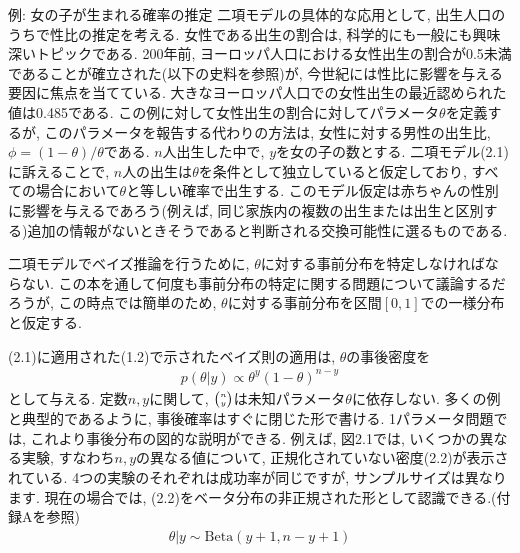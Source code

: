 \documentclass[10pt,dvipdfmx,a4]{beamer}
\newcommand{\eq}[1]{\begin{align}#1\end{align}}
\begin{document}

\begin{frame}{例: 女の子が生まれる確率の推定}
二項モデルの具体的な応用として, 出生人口のうちで性比の推定を考える.
女性である出生の割合は, 科学的にも一般にも興味深いトピックである.
200年前, ヨーロッパ人口における女性出生の割合が0.5未満であることが確立された(以下の史料を参照)が, 今世紀には性比に影響を与える要因に焦点を当てている.
大きなヨーロッパ人口での女性出生の最近認められた値は0.485である.
この例に対して女性出生の割合に対してパラメータ$\theta$を定義するが, このパラメータを報告する代わりの方法は, 女性に対する男性の出生比, $\phi=(1-\theta)/\theta$である.
$n$人出生した中で, $y$を女の子の数とする.
二項モデル(2.1)に訴えることで, $n$人の出生は$\theta$を条件として独立していると仮定しており, すべての場合において$\theta$と等しい確率で出生する.
このモデル仮定は赤ちゃんの性別に影響を与えるであろう(例えば, 同じ家族内の複数の出生または出生と区別する)追加の情報がないときそうであると判断される交換可能性に選るものである.
\end{frame}


\begin{frame}
二項モデルでベイズ推論を行うために, $\theta$に対する事前分布を特定しなければならない.
この本を通して何度も事前分布の特定に関する問題について議論するだろうが, この時点では簡単のため, $\theta$に対する事前分布を区間$[0,1]$での一様分布と仮定する.

(2.1)に適用された(1.2)で示されたベイズ則の適用は, $\theta$の事後密度を
\eq{p(\theta|y)\propto \theta^y(1-\theta)^{n-y}}
として与える.
定数$n, y$に関して, ${\tiny\begin{pmatrix}n\\y\end{pmatrix}}$は未知パラメータ$\theta$に依存しない.
多くの例と典型的であるように, 事後確率はすぐに閉じた形で書ける.
1パラメータ問題では, これより事後分布の図的な説明ができる.
例えば, 図2.1では, いくつかの異なる実験, すなわち$n, y$の異なる値について, 正規化されていない密度(2.2)が表示されている.
4つの実験のそれぞれは成功率が同じですが, サンプルサイズは異なります.
現在の場合では, (2.2)をベータ分布の非正規された形として認識できる.(付録Aを参照)
\eq{\theta|y\sim \text{Beta}(y+1,n-y+1)}
\end{frame}

\end{document}
